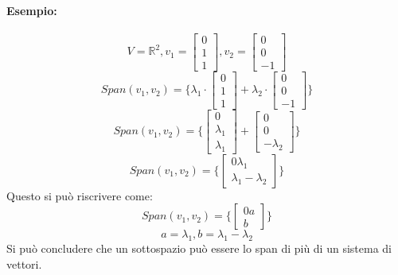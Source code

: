 \documentclass[12pt,a4paper]{article}
\begin{document}
\paragraph{Esempio:}
\[
V = \mathbb{R}^2, v_1 = \begin{bmatrix}
  0\\
  1\\
  1
\end{bmatrix}, v_2 = \begin{bmatrix}
  0\\
  0\\
  -1
\end{bmatrix}
\]
\[
Span(v_1,v_2) = \{\lambda_1 \cdot \begin{bmatrix}
  0\\
  1\\
  1
\end{bmatrix} + \lambda_2 \cdot \begin{bmatrix}
  0\\
  0\\
  -1
\end{bmatrix}\}
\]
\[
Span(v_1,v_2) = \{\begin{bmatrix}
  0\\
  \lambda_1\\
  \lambda_1
\end{bmatrix} + \begin{bmatrix}
  0\\
  0\\
  -\lambda_2
\end{bmatrix}\}
\]
\[
Span(v_1,v_2) = \{\begin{bmatrix}
  0
  \lambda_1\\
  \lambda_1 - \lambda_2
\end{bmatrix}\}
\]
Questo si può riscrivere come:
\[
Span(v_1,v_2) = \{\begin{bmatrix}
  0
  a\\
  b
\end{bmatrix}\}
\]
\[
a = \lambda_1, b = \lambda_1 - \lambda_2
\]
Si può concludere che un sottospazio può essere lo span di più di un sistema di vettori.
\end{document}
